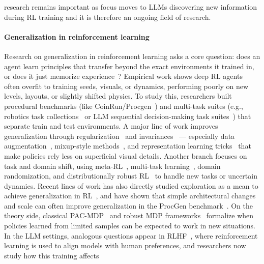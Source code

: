 \documentclass[10pt]{article} %
\begin{document}
research remains important as focus moves to LLMs discovering new information during RL training and it is therefore an ongoing field of research.

\paragraph{Generalization in reinforcement learning} Research on generalization in reinforcement learning asks a core question: does an agent learn principles that transfer beyond the exact environments it trained in, or does it just memorize experience~\citep{zhang2018studyoverfittingdeepreinforcement,zhang2018dissectionoverfittinggeneralizationcontinuous,schaul2019rayinterferencesourceplateaus,bengio2020interferencegeneralizationtemporaldifference}? Empirical work shows deep RL agents often overfit to training seeds, visuals, or dynamics, performing poorly on new levels, layouts, or slightly shifted physics. To study this, researchers built procedural benchmarks (like CoinRun/Procgen~\citep{cobbe2020leveragingproceduralgenerationbenchmark}) and multi-task suites (e.g., robotics task collections~\citep{yu2021metaworldbenchmarkevaluationmultitask,atamuradov2025evaluatingmodelagnosticmetalearningmetaworld} or LLM sequential decision-making task suites~\citep{tajwar2025traininggenerallycuriousagent}) that separate train and test environments. A major line of work improves generalization through regularization~\citep{kostrikov2021imageaugmentationneedregularizing} and invariances~\citep{zhang2021learninginvariantrepresentationsreinforcement} — especially data augmentation~\citep{rad2020,raileanu2021automaticdataaugmentationgeneralization}, mixup-style methods~\citep{mixreg}, and representation learning tricks~\citep{higgins2018darlaimprovingzeroshottransfer,srinivas2020curlcontrastiveunsupervisedrepresentations,wang2021unsupervisedvisualattentioninvariance} that make policies rely less on superficial visual details. Another branch focuses on task and domain shift, using meta-RL~\citep{duan2016rl2fastreinforcementlearning,finn2017modelagnosticmetalearningfastadaptation,liang2024dynamiterldynamicmodelimproved}, multi-task learning~\citep{brunskill2013samplecomplexitymultitaskreinforcement}, domain randomization, and distributionally robust RL~\citep{clavier2022robustreinforcementlearningdistributional,lu2024distributionallyrobustreinforcementlearning,shi2025curiouspricedistributionalrobustness} to handle new tasks or uncertain dynamics. Recent lines of work has also directly studied exploration as a mean to achieve generalization in RL~\citep{jiang2023rlgeneralizationexploration}, and have shown that simple architectural changes and scale can often improve generalization in the ProcGen benchmark~\citep{jesson2024improvinggeneralizationprocgenbenchmark}. On the theory side, classical PAC-MDP~\citep{strehl2009pacmdps} and robust MDP frameworks~\citep{robustmdps,robustdynamicprogramming} formalize when policies learned from limited samples can be expected to work in new situations. In the LLM settings, analogous questions appear in RLHF~\citep{ouyang2022traininglanguagemodelsfollow}, where reinforcement learning is used to align models with human preferences, and researchers now study how this training affects 
\end{document}
